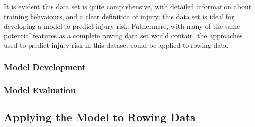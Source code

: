 It is evident this data set is quite comprehensive, with detailed information about training behvaiours, and a clear definition of injury; this data set is ideal for developing a model to predict injury risk. Futhermore, with many of the same potential features as a complete rowing data set would contain, the approaches used to predict injury risk in this dataset could be applied to rowing data.

\subsubsection{Model Development}


\subsubsection{Model Evaluation}

\subsection{Applying the Model to Rowing Data}
